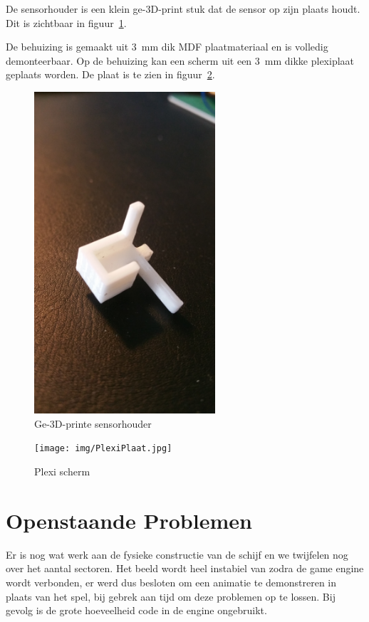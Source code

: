 \documentclass[12pt]{ugentreport}
\begin{document}
De sensorhouder is een klein ge-3D-print stuk dat de sensor op zijn plaats
houdt. Dit is zichtbaar in figuur~\ref{fig:sensorhouder}.

De behuizing is gemaakt uit \SI{3}{\milli\metre} dik MDF plaatmateriaal en is volledig demonteerbaar.
Op de behuizing kan een scherm uit een \SI{3}{\milli\metre} dikke plexiplaat geplaats worden. De plaat is te zien in figuur~\ref{fig:plexiplaat}.

\begin{figure}
  \centering
  \includegraphics[width=0.6\textwidth]{img/SensorHouder.jpg}
  \caption{Ge-3D-printe sensorhouder}
  \label{fig:sensorhouder}
\end{figure}

\begin{figure}
  \centering
  \texttt{[image: img/PlexiPlaat.jpg]}
  \caption{Plexi scherm}
  \label{fig:plexiplaat}
\end{figure}

\section{Openstaande Problemen}
Er is nog wat werk aan de fysieke constructie van de schijf en we twijfelen nog
over het aantal sectoren. Het beeld wordt heel instabiel van zodra de game
engine wordt verbonden, er werd dus besloten om een animatie te demonstreren in
plaats van het spel, bij gebrek aan tijd om deze problemen op te lossen.
Bij gevolg is de grote hoeveelheid code in de engine ongebruikt.
\end{document}

